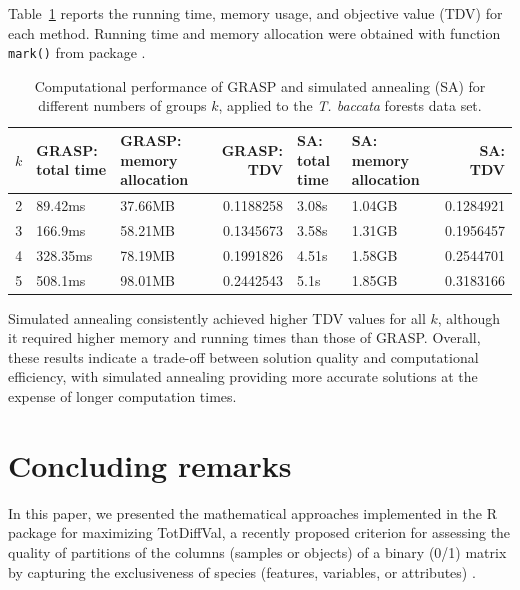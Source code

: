 Table~\ref{tab:benchmark2-latex} reports the running time, memory usage, and objective value (TDV) for each method. Running time and memory allocation were obtained with function \texttt{mark()} from package  \citep{HV2021}.

\begin{table}
\centering
\caption{\label{tab:benchmark2-latex}Computational performance of GRASP and simulated annealing (SA) for different numbers of groups $k$, applied to the \emph{T. baccata} forests data set.}
\centering
\fontsize{7}{9}\selectfont
\begin{tabular}[t]{r|l|l|r|l|l|r}
\hline
$k$ & GRASP: total time & GRASP: memory allocation & GRASP: TDV & SA: total time & SA: memory allocation & SA: TDV\\
\hline
2 & 89.42ms & 37.66MB & 0.1188258 & 3.08s & 1.04GB & 0.1284921\\
\hline
3 & 166.9ms & 58.21MB & 0.1345673 & 3.58s & 1.31GB & 0.1956457\\
\hline
4 & 328.35ms & 78.19MB & 0.1991826 & 4.51s & 1.58GB & 0.2544701\\
\hline
5 & 508.1ms & 98.01MB & 0.2442543 & 5.1s & 1.85GB & 0.3183166\\
\hline
\end{tabular}
\end{table}

Simulated annealing consistently achieved higher TDV values for all \(k\), although it required higher memory and running times than those of GRASP. Overall, these results indicate a trade-off between solution quality and computational efficiency, with simulated annealing providing more accurate solutions at the expense of longer computation times.

\section{Concluding remarks}\label{concluding-remarks}

In this paper, we presented the mathematical approaches implemented in the R package  for maximizing TotDiffVal, a recently proposed criterion for assessing the quality of partitions of the columns (samples or objects) of a binary (0/1) matrix by capturing the exclusiveness of species (features, variables, or attributes) \citep{MH2025}.

